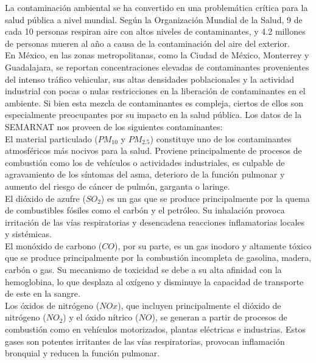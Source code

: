 \documentclass[12pt, letterpaper]{report}
\begin{document}
La contaminación ambiental se ha convertido en una problemática crítica para la salud pública a nivel mundial. Según la Organización Mundial de la Salud, 9 de cada 10 personas respiran aire con altos niveles de contaminantes, y 4.2 millones de personas mueren al año a causa de la contaminación del aire del exterior. \cite{who2018}
\\

En México, en las zonas metropolitanas, como la Ciudad de México, Monterrey y Guadalajara, se reportan concentraciones elevadas de contaminantes provenientes del intenso tráfico vehicular, sus altas densidades poblacionales y la actividad industrial con pocas o nulas restricciones en la liberación de contaminantes en el ambiente. Si bien esta mezcla de contaminantes es compleja, ciertos de ellos son especialmente preocupantes por su impacto en la salud pública. Los datos de la SEMARNAT nos proveen de los siguientes contaminantes:
\\

El material particulado ($PM_{10}$ y $PM_{2.5}$) constituye uno de los contaminantes atmosféricos más nocivos para la salud. Proviene principalmente de procesos de combustión como los de vehículos o actividades industriales, es culpable de agravamiento de los síntomas del asma, deterioro de la función pulmonar y aumento del riesgo de cáncer de pulmón, garganta o laringe.\cite{airly}
\\

El dióxido de azufre ($SO_2$) es un gas que se produce principalmente por la quema de combustibles fósiles como el carbón y el petróleo. Su inhalación provoca irritación de las vías respiratorias y desencadena reacciones inflamatorias locales y sistémicas. \cite{ivhhn2003}
\\

El monóxido de carbono ($CO$), por su parte, es un gas inodoro y altamente tóxico que se produce principalmente por la combustión incompleta de gasolina, madera, carbón o gas. Su mecanismo de toxicidad se debe a su alta afinidad con la hemoglobina, lo que desplaza al oxígeno y disminuye la capacidad de transporte de este en la sangre. \cite{mayoclinic2025}
\\

Los óxidos de nitrógeno ($NOx$), que incluyen principalmente el dióxido de nitrógeno ($NO_2$) y el óxido nítrico ($NO$), se generan a partir de procesos de combustión como en vehículos motorizados, plantas eléctricas e industrias. Estos gases son potentes irritantes de las vías respiratorias, provocan inflamación bronquial y reducen la función pulmonar. \cite{atsdr2016}
\\
\end{document}
